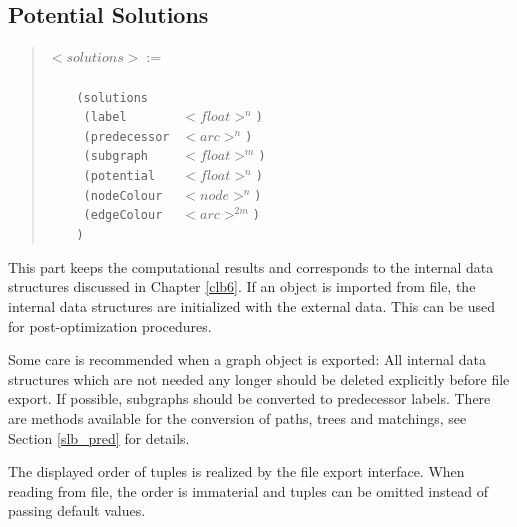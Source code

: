 \documentclass[a4paper,11pt,twoside]{book}
\begin{document}
\begin{multicols}{2}
\subsection{Potential Solutions}
\begin{quote}
$<solutions> :=$\verb/    /\\
\verb/    /\\
\verb/    (solutions/\\
\verb/     (label       / $<float>^n$\verb/)/\\
\verb/     (predecessor / $<arc>^n$\verb/)/\\
\verb/     (subgraph    / $<float>^m$\verb/)/\\
\verb/     (potential   / $<float>^n$\verb/)/\\
\verb/     (nodeColour  / $<node>^n$\verb/)/\\
\verb/     (edgeColour  / $<arc>^{2m}$\verb/)/\\
\verb/    )/\\
\end{quote}
This part keeps the computational results and corresponds to the internal data
structures discussed in Chapter \ref{clb6}. If an object is imported from file,
the internal data structures are initialized with the external data. This can
be used for post-optimization procedures.

Some care is recommended when a graph object is exported:
All internal data structures which are not needed any longer should be deleted
explicitly before file export. If possible, subgraphs should be converted to
predecessor labels. There are methods available for the conversion of paths,
trees and matchings, see Section \ref{slb_pred} for details.

The displayed order of tuples is realized by the file export interface.
When reading from file, the order is immaterial and tuples can be omitted
instead of passing default values.



\end{multicols}
\end{document}
